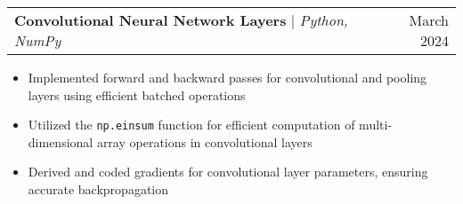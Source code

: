 \documentclass[letterpaper,11pt]{article}
\makeatletter
\newcommand{\resumeItem}[1]{
  \item\small{
    {#1 \vspace{-2pt}}
  }
}
\newcommand{\resumeProjectHeading}[2]{
    \item
    \begin{tabular*}{0.97\textwidth}{l@{\extracolsep{\fill}}r}
      \small#1 & #2 \\
    \end{tabular*}\vspace{-7pt}
}
\newcommand{\resumeItemListStart}{\begin{itemize}}
\newcommand{\resumeItemListEnd}{\end{itemize}\vspace{-5pt}}
\makeatother
\begin{document}
\resumeProjectHeading
{\textbf{Convolutional Neural Network Layers} $|$ \emph{Python, NumPy}}{March 2024}
\resumeItemListStart
\resumeItem{Implemented forward and backward passes for convolutional and pooling layers using efficient batched operations}
\resumeItem{Utilized the \texttt{np.einsum} function for efficient computation of multi-dimensional array operations in convolutional layers}
\resumeItem{Derived and coded gradients for convolutional layer parameters, ensuring accurate backpropagation}
\resumeItemListEnd




\end{document}
